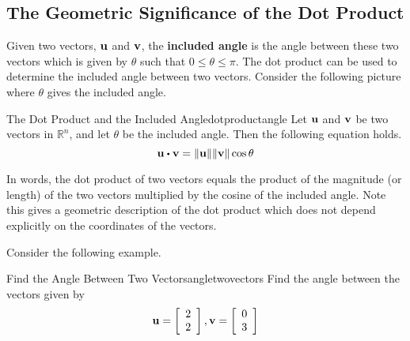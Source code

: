 \subsection{The Geometric Significance of the Dot Product}

Given two vectors, ${\bf u}$ and ${\bf v}$, the \textbf{included angle}
  is the angle between these two vectors which
is given by $\theta$ such that $0 \leq \theta \leq \pi$. The dot product can be used to
determine the included angle between two vectors. Consider the following picture where $\theta$ gives the included angle. 

\begin{center}
\end{center}

\begin{proposition}{The Dot Product and the Included Angle}{dotproductangle}
Let ${\bf u}$ and ${\bf v}$ be two vectors in $\mathbb{R}^n$, and let 
$\theta$ be the included angle. Then the following equation holds.
\begin{equation*}
\vect{u}\dotprod \vect{v}=\vectlength \vect{u}\vectlength \vectlength \vect{v}
\vectlength \cos \theta 
\end{equation*}
\end{proposition}

In words, the dot product of two vectors equals the product of
the magnitude (or length) of the two vectors multiplied by the cosine of the included
angle. Note this gives a geometric description of the dot product which does
not depend explicitly on the coordinates of the vectors.

Consider the following example.

\begin{example}{Find the Angle Between Two Vectors}{angletwovectors}
Find the angle between the vectors given by 
\begin{equation*}
{\bf u}
=
\left[
\begin{array}{r}
2 \\
2
\end{array}
\right], 
{\bf v}
=
\left[
\begin{array}{r}
0 \\
3 
\end{array}
\right]
\end{equation*}
\end{example}

